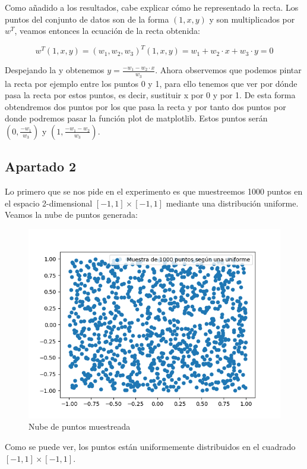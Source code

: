 \documentclass[12pt,a4paper]{article}
\begin{document}
Como añadido a los resultados, cabe explicar cómo he representado la recta. Los puntos del conjunto de datos son de la forma $(1,x,y)$ y son multiplicados por $w^T$, veamos entonces la ecuación de la recta obtenida:

$$w^T(1,x,y) = (w_1,w_2,w_3)^T(1,x,y) = w_1 + w_2\cdot x + w_3\cdot y = 0$$

Despejando la y obtenemos $y = \frac{-w_1 - w_2\cdot x}{w_3}$. Ahora observemos que podemos pintar la recta por ejemplo entre los puntos 0 y 1, para ello tenemos que ver por dónde pasa la recta por estos puntos, es decir, sustituir x por 0 y por 1. De esta forma obtendremos dos puntos por los que pasa la recta y por tanto dos puntos por donde podremos pasar la función plot de matplotlib. Estos puntos serán $(0,\frac{-w_1}{w_3})$ y $(1,\frac{-w_1 - w_2}{w_3})$.

\subsection{Apartado 2}
Lo primero que se nos pide en el experimento es que muestreemos 1000 puntos en el espacio 2-dimensional $[-1,1]\times [-1,1]$ mediante una distribución uniforme. Veamos la nube de puntos generada:

\begin{figure}[H]
	\centering
	\includegraphics[scale=0.7]{./Imagenes/ej2-2-1.png}
	\caption{Nube de puntos muestreada}
	\label{ej2-2-1}
\end{figure}

Como se puede ver, los puntos están uniformemente distribuidos en el cuadrado $[-1,1]\times [-1,1]$.
\end{document}
